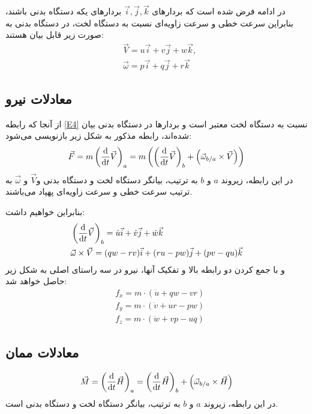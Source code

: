 در ادامه فرض شده است که بردارهای $\vec{i},\vec{j},\vec{k}$  بردارهای یکه دستگاه بدنی باشند، بنابراین سرعت خطی و سرعت زاویه‌ای نسبت به دستگاه لخت، در دستگاه بدنی به صورت زیر قابل بیان هستند:
\begin{equation}
\begin{split}
& \vec{V}=u\vec{i}+v\vec{j}+ w\vec{k}, \\
& \vec{\omega}=p\vec{i} +q\vec{j}+r\vec{k}
\end{split}
\end{equation}
\subsection{معادلات نیرو}
از آنجا که رابطه
\eqref{E4}
 نسبت به دستگاه لخت معتبر است و بردارها در دستگاه بدنی بیان شده‌اند، رابطه مذکور به شکل زیر بازنویسی می‌شود:
\begin{equation}
\vec{F}=m \left( {\frac 
{\rm d}{{\rm d}t}}\vec{V}   \right) _{{a}} =m\left( \left( {\frac 
{\rm d}{{\rm d}t}}\vec{V}   \right) _{{b}}+\left( \vec{\omega}_{{ b}/{a}}\times \vec{V}   \right)\right)
\end{equation}
در این رابطه، زیروند $a$ و $b$ به ترتیب، بیانگر دستگاه لخت و دستگاه بدنی و$  \vec{V}$ و $\vec{\omega}$  به ترتیب سرعت خطی و سرعت زاویه‌ای پهپاد می‌باشند.

بنابراین خواهیم داشت:
\begin{align}
& \left( {\frac {\rm d}{{\rm d}t}}\vec{V} \right) _{{b}}=\dot u \vec{i}+\dot v \vec{j}+\dot w \vec{k} \\
& \vec{\omega} \times \vec{V} = (qw-rv)\vec{i}+(ru-pw)\vec{j}+(pv-qu)\vec{k}
\end{align}
و با جمع کردن دو رابطه بالا و تفکیک آنها، نیرو در سه راستای اصلی به شکل زیر حاصل خواهد شد:
\begin{equation} \label{eq:forceequation}
\begin{split}
& f_{{x}}=m\cdot \left( \dot u +qw-vr \right) \\
& f_{{y}}=m\cdot \left( \dot v +ur-pw \right) \\
& f_{{z}}=m\cdot \left( \dot w +vp-uq \right)
\end{split}
\end{equation}
\subsection{معادلات ممان}
\begin{equation}
\vec{M}= \left( {\frac 
{\rm d}{{\rm d}t}}\vec{H}   \right) _{{a}} = \left( {\frac 
{\rm d}{{\rm d}t}}\vec{H}   \right) _{{b}}+\left( \vec{\omega}_{{b}/{a}}\times \vec{H}   \right)
\end{equation}
در این رابطه، زیروند $a$ و $b$ به ترتیب، بیانگر دستگاه لخت و دستگاه بدنی است.

